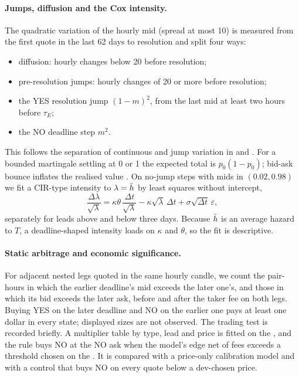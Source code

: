 \paragraph{Jumps, diffusion and the Cox intensity.}
The quadratic variation of the hourly mid (spread at most 10\cents) is measured from the first quote in
the last 62 days to resolution and split four ways:
\begin{itemize}
\item diffusion: hourly changes below 20\cents{} before resolution;
\item pre-resolution jumps: hourly changes of 20\cents{} or more before resolution;
\item the YES resolution jump $(1-m)^2$, from the last mid at least two hours before $\tau_E$;
\item the NO deadline step $m^2$.
\end{itemize}
This follows the separation of continuous and jump variation in \citet{barndorffnielsen2004} and
\citet{andersenbollerslevdiebold2007}. For a bounded martingale settling at 0 or 1 the expected total
is $p_0(1-p_0)$; bid-ask bounce inflates the realised value \citep{roll1984,zhang2005}. On no-jump
steps with mids in $(0.02,0.98)$ we fit a CIR-type intensity \citep{cox1985cir,duffiepansingleton2000}
to $\lambda=\bar h$ by least squares without intercept,
\begin{equation}
\frac{\Delta\lambda}{\sqrt{\lambda}}=\kappa\theta\,\frac{\Delta t}{\sqrt{\lambda}}-\kappa\sqrt{\lambda}\,\Delta t+\sigma\sqrt{\Delta t}\,\varepsilon ,\label{haz-eq-cir}
\end{equation}
separately for leads above and below three days. Because $\bar h$ is an average hazard to $T$, a
deadline-shaped intensity loads on $\kappa$ and $\theta$, so the fit is descriptive.

\paragraph{Static arbitrage and economic significance.}
For adjacent nested legs quoted in the same hourly candle, we count the pair-hours in which the
earlier deadline's mid exceeds the later one's, and those in which its bid exceeds the later ask,
before and after the taker fee on both legs. Buying YES on the later deadline and NO on the earlier
one pays at least one dollar in every state; displayed sizes are not observed. The trading test is
recorded briefly. A multiplier table by type, lead and price is fitted on the \estim, and the rule
buys NO at the NO ask when the model's edge net of fees exceeds a threshold chosen on the \estim.
It is compared with a price-only calibration model and with a control that buys NO on every quote
below a dev-chosen price.

